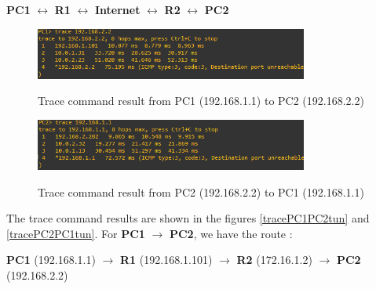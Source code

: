 \documentclass[10pt,a4paper]{ULBreport}
\begin{document}
\begin{center}
    \centering
    \textbf{PC1} $\leftrightarrow$ \textbf{R1} $\leftrightarrow$ \textbf{Internet}  $\leftrightarrow$ \textbf{R2}  $\leftrightarrow$ \textbf{PC2} 
\end{center}

\begin{figure}[H]
    \caption{Trace command result from PC1 (192.168.1.1) to PC2 (192.168.2.2)}
    \centering
    \includegraphics[width=0.8\textwidth]{Images/tracePC1PC2.png}
    \label{tracePC1PC2}
\end{figure}

\begin{figure}[H]
    \caption{Trace command result from PC2 (192.168.2.2) to PC1 (192.168.1.1)}
    \centering
    \includegraphics[width=0.8\textwidth]{Images/tracePC2PC1.png}
    \label{tracePC2PC1}
\end{figure}   





The trace command results are shown in the figures \ref{tracePC1PC2tun} and \ref{tracePC2PC1tun}. For \textbf{PC1} $\rightarrow$ \textbf{PC2}, we have the route :

\begin{center}
    \centering
    \textbf{PC1} (192.168.1.1) $\rightarrow$ \textbf{R1} (192.168.1.101) $\rightarrow$ \textbf{R2} (172.16.1.2)  $\rightarrow$ \textbf{PC2} (192.168.2.2)
\end{center}
\end{document}
